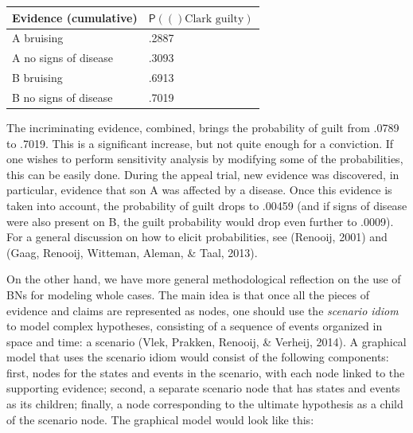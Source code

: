 \documentclass[11pt,dvipsnames,enabledeprecatedfontcommands]{scrartcl}
\newcommand{\pr}[1]{\mathsf{P}(#1)}
\begin{document}
\begin{center}
\begin{tabular}{@{}ll@{}}
\toprule
Evidence (cumulative) & $\pr(\textrm{Clark guilty})$ 
\\ \midrule 
A bruising& .2887\\
A no signs of disease & .3093\\
B bruising & .6913\\
B no signs of disease  & .7019\\
 \bottomrule
\end{tabular}
\end{center}

\noindent  The incriminating evidence, combined, brings the probability
of guilt from .0789 to .7019. This is a significant increase, but not
quite enough for a conviction. If one wishes to perform sensitivity
analysis by modifying some of the probabilities, this can be easily
done. During the appeal trial, new evidence was discovered, in
particular, evidence that son A was affected by a disease. Once this
evidence is taken into account, the probability of guilt drops to .00459
(and if signs of disease were also present on B, the guilt probability
would drop even further to .0009). For a general discussion on how to
elicit probabilities, see (Renooij, 2001) and (Gaag, Renooij, Witteman,
Aleman, \& Taal, 2013).

On the other hand, we have more general methodological reflection on the
use of BNs for modeling whole cases. The main idea is that once all the
pieces of evidence and claims are represented as nodes, one should use
the \textit{scenario idiom} to model complex hypotheses, consisting of a
sequence of events organized in space and time: a scenario (Vlek,
Prakken, Renooij, \& Verheij, 2014). A graphical model that uses the
scenario idiom would consist of the following components: first, nodes
for the states and events in the scenario, with each node linked to the
supporting evidence; second, a separate scenario node that has states
and events as its children; finally, a node corresponding to the
ultimate hypothesis as a child of the scenario node. The graphical model
would look like this:
\end{document}
